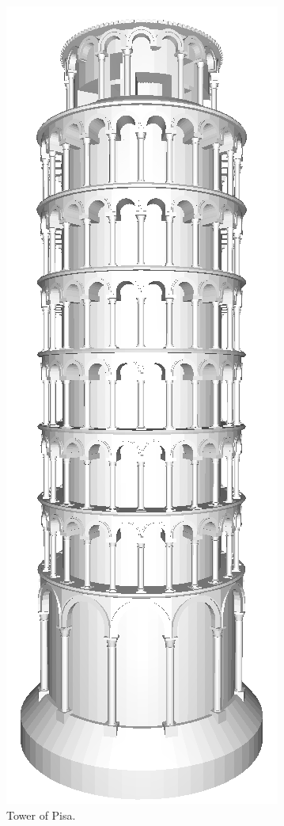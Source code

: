 \begin{figure}[!ht]
\begin{center}
\includegraphics[height=0.95\textheight]{img/pisa-0.png}
\end{center}
\vspace{-4mm}
\caption{Tower of Pisa.}
\label{fig:pisa-0}
\end{figure}


